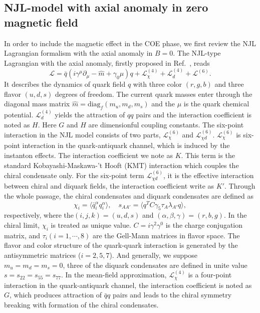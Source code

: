 \documentclass[prd, showpacs,nofootinbib,amsmath,amssymb]{revtex4}
\begin{document}
\subsection{NJL-model with axial anomaly in zero magnetic field}
In order to  include the magnetic effect  in the COE phase,
we first review the NJL Lagrangian formalism with the axial anomaly in $B =0$.
The NJL-type Lagrangian with the axial anomaly, firstly proposed in Ref.~\cite{abuki2010nambu}, reads
\begin{equation}
 \mathcal{L} = \bar{q} (i\gamma^\mu \partial_\mu - \hat{m} + \gamma_0\mu ) q +
\mathcal{L}^{\left(4\right)}_{\chi} + \mathcal{L}^{\left(4\right)}_{d} + \mathcal{L}^{\left(6\right)}.
\label{eq:lag}
\end{equation}
It describes the dynamics of quark field $q$ with three color $(r, g, b)$ and three flavor $(u, d, s)$ degrees of freedom. The current quark masses enter
through the diagonal mass matrix $\hat{m} = \text{diag}_f(m_u,m_d,m_s)$ and the $\mu$ is the quark chemical potential.
$\mathcal{L}^{\left(4\right)}_{d}$  yields the attraction of $qq$ pairs and the interaction coefficient is noted as $H$.
Here $G$ and $H$ are dimensionful coupling constants.
The six-point interaction in the NJL model consists of two parts, $\mathcal{L}^{\left(6\right)}_{\chi}$ and $\mathcal{L}^{\left(6\right)}_{\chi d}$.
$\mathcal{L}^{\left(6\right)}_{\chi}$ is six-point interaction in the quark-antiquark channel, which is induced by the instanton effects.
The interaction coefficient we note as $K$.
This term is the standard Kobayashi-Maskawa-'t Hooft (KMT) interaction which couples the chiral condensate only.
For the six-point term $\mathcal{L}^{\left(6\right)}_{\chi d}$, it is the effective interaction between chiral and diquark fields,
the interaction coefficient write as $K'$.
Through the whole passage, the chiral condensates and diquark condensates are defined as
\begin{equation}
\chi_i= \langle\bar{q}^\alpha_i q^\alpha_i\rangle,\quad
s_{AA'}= \langle q^TC\gamma_5\tau_A\lambda_{A'} q\rangle,
\end{equation}
respectively, where the$(i,j,k)=(u,d,s)$ and $(\alpha,\beta,\gamma)=(r,b,g)$.
In the chiral limit, $\chi_i$ is treated as unique value.
$C = i\gamma^2\gamma^0$ is the charge conjugation matrix, and $\tau_i (i = 1, \cdots, 8)$ are the Gell-Mann matrices in flavor space.
The flavor and color structure of the quark-quark interaction is generated by the antisymmetric matrices ($i =2, 5, 7$).
And generally, we suppose $m_u=m_d=m_s=0$, three of the diquark condensates are defined in unite value $s=s_{22}=s_{55}=s_{77}$.
In the mean-field approximation, $\mathcal{L}^{\left(4\right)}_{\chi}$  is a four-point interaction in the quark-antiquark channel,
the interaction coefficient is noted as $G$,
which produces attraction of $\bar{q}q$ pairs and leads to the chiral symmetry breaking with formation of the chiral condensates.
\end{document}
